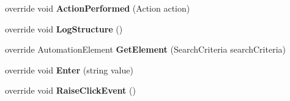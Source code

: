 \begin{DoxyCompactItemize}
\item 
\hypertarget{class_proto_test_1_1_golem_1_1_white_1_1_elements_1_1_white_list_view_a39f8a1f49dae252cecdda5be5330a51f}{override void {\bfseries Action\-Performed} (Action action)}\label{class_proto_test_1_1_golem_1_1_white_1_1_elements_1_1_white_list_view_a39f8a1f49dae252cecdda5be5330a51f}

\item 
\hypertarget{class_proto_test_1_1_golem_1_1_white_1_1_elements_1_1_white_list_view_a597b98bb7f03e4e7e6a96ae4acd8a7e4}{override void {\bfseries Log\-Structure} ()}\label{class_proto_test_1_1_golem_1_1_white_1_1_elements_1_1_white_list_view_a597b98bb7f03e4e7e6a96ae4acd8a7e4}

\item 
\hypertarget{class_proto_test_1_1_golem_1_1_white_1_1_elements_1_1_white_list_view_a37917354bd45f19b90760dd77ab90d6f}{override Automation\-Element {\bfseries Get\-Element} (Search\-Criteria search\-Criteria)}\label{class_proto_test_1_1_golem_1_1_white_1_1_elements_1_1_white_list_view_a37917354bd45f19b90760dd77ab90d6f}

\item 
\hypertarget{class_proto_test_1_1_golem_1_1_white_1_1_elements_1_1_white_list_view_a5516ab05bc542247a99d5597c34f82f3}{override void {\bfseries Enter} (string value)}\label{class_proto_test_1_1_golem_1_1_white_1_1_elements_1_1_white_list_view_a5516ab05bc542247a99d5597c34f82f3}

\item 
\hypertarget{class_proto_test_1_1_golem_1_1_white_1_1_elements_1_1_white_list_view_adc690d28071bd0a39b73a4d66e496de7}{override void {\bfseries Raise\-Click\-Event} ()}\label{class_proto_test_1_1_golem_1_1_white_1_1_elements_1_1_white_list_view_adc690d28071bd0a39b73a4d66e496de7}

\end{DoxyCompactItemize}

